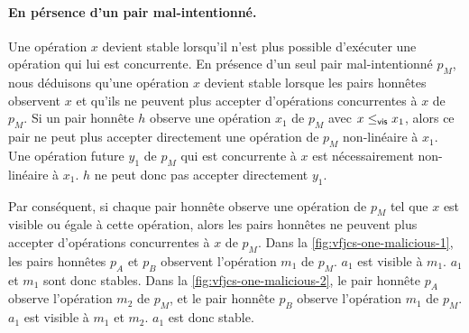 \paragraph{En pérsence d'un pair mal-intentionné.}
Une opération $x$ devient stable lorsqu'il n'est plus possible d'exécuter une opération qui lui est concurrente.
En présence d'un seul pair mal-intentionné $p_M$, nous déduisons qu'une opération $x$ devient stable lorsque les pairs honnêtes observent $x$ et qu'ils ne peuvent plus accepter d'opérations concurrentes à $x$ de $p_M$.
Si un pair honnête $h$ observe une opération $x_1$ de $p_M$ avec $x \leq_{\operatorname{\mathsf{vis}}} x_1$, alors ce pair ne peut plus accepter directement une opération de $p_M$ non-linéaire à $x_1$.
Une opération future $y_1$ de $p_M$ qui est concurrente à $x$ est nécessairement non-linéaire à $x_1$.
$h$ ne peut donc pas accepter directement $y_1$.


Par conséquent, si chaque pair honnête observe une opération de $p_M$ tel que $x$ est visible ou égale à cette opération, alors les pairs honnêtes ne peuvent plus accepter d'opérations concurrentes à $x$ de $p_M$.
Dans la \autoref{fig:vfjcs-one-malicious-1}, les pairs honnêtes $p_A$ et $p_B$ observent l'opération $m_1$ de $p_M$.
$a_1$ est visible à $m_1$.
$a_1$ et $m_1$ sont donc stables.
Dans la \autoref{fig:vfjcs-one-malicious-2}, le pair honnête $p_A$ observe l'opération $m_2$ de $p_M$, et le pair honnête $p_B$ observe l'opération $m_1$ de $p_M$.
$a_1$ est visible à $m_1$ et $m_2$.
$a_1$ est donc stable.

